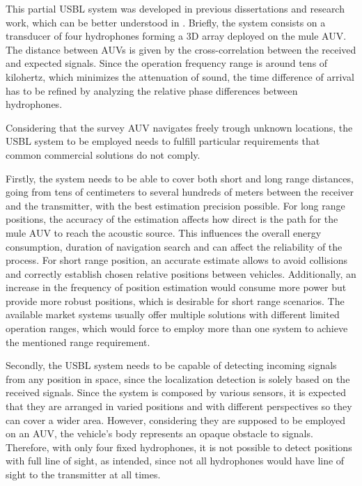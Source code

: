 
This partial USBL system was developed in previous dissertations and research work, which can be better understood in \cite{afonso-thesis}. Briefly, the system consists on a transducer of four hydrophones forming a 3D array deployed on the mule AUV. The distance between AUVs is given by the cross-correlation between the received and expected signals. Since the operation frequency range is around tens of kilohertz, which minimizes the attenuation of sound, the time difference of arrival has to be refined by analyzing the relative phase differences between hydrophones.

Considering that the survey AUV navigates freely trough unknown locations, the USBL system to be employed needs to fulfill particular requirements that common commercial solutions do not comply. 

Firstly, the system needs to be able to cover both short and long range distances, going from tens of centimeters to several hundreds of meters between the receiver and the transmitter, with the best estimation precision possible. For long range positions, the accuracy of the estimation affects how direct is the path for the mule AUV to reach the acoustic source. This influences the overall energy consumption, duration of navigation search and can affect the reliability of the process. For short range position, an accurate estimate allows to avoid collisions and correctly establish chosen relative positions between vehicles. Additionally, an increase in the frequency of position estimation would consume more power but provide more robust positions, which is desirable for short range scenarios. The available market systems usually offer multiple solutions with different limited operation ranges, which would force to employ more than one system to achieve the mentioned range requirement.

Secondly, the USBL system needs to be capable of detecting incoming signals from any position in space, since the localization detection is solely based on the received signals. Since the system is composed by various sensors, it is expected that they are arranged in varied positions and with different perspectives so they can cover a wider area. However, considering they are supposed to be employed on an AUV, the vehicle's body represents an opaque obstacle to signals. Therefore, with only four fixed hydrophones, it is not possible to detect positions with full line of sight, as intended, since not all hydrophones would have line of sight to the transmitter at all times.

